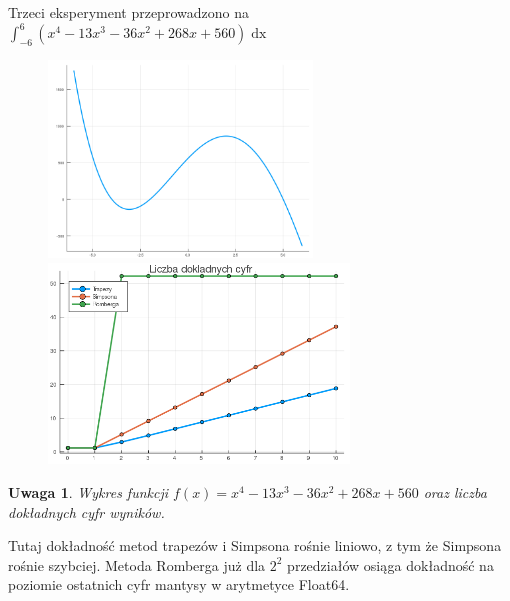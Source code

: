 \documentclass[11pt,wide]{article}
\newtheorem{remark}{Uwaga}
\begin{document}
Trzeci eksperyment przeprowadzono na \(\displaystyle \int_{-6}^{6} (x^4 - 13x^3 - 36x^2 + 268x + 560)\mathop{dx} \)
\begin{figure}[h!]
	\includegraphics[width=70mm,scale=0.5]{wiel4}
	\includegraphics[width=80mm,scale=0.5]{wiel_blad4}
\end{figure}
\begin{remark}
\centering
Wykres funkcji \(f(x) = x^4 - 13x^3 - 36x^2 + 268x + 560 \) oraz liczba dokładnych cyfr wyników.
\end{remark}
Tutaj dokładność metod trapezów i Simpsona rośnie liniowo, z tym że Simpsona rośnie szybciej. Metoda Romberga już dla \(2^2\) przedziałów osiąga dokładność na poziomie ostatnich cyfr mantysy w arytmetyce Float64.
\pagebreak
\end{document}
